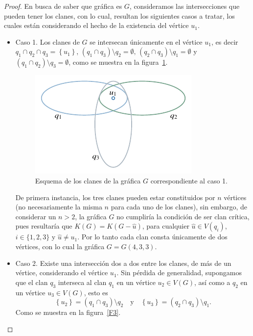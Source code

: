 \documentclass[12pt]{book}
\theoremstyle{definition}
\begin{document}
\begin{proof}
En busca de saber que gráfica es $G$, consideramos las intersecciones que pueden tener los clanes, con lo cual, resultan los siguientes casos a tratar, los cuales están considerando el hecho de la existencia del vértice $u_1$.
\begin{itemize}
\item Caso 1. 
Los clanes de $G$ se intersecan únicamente en el vértice $u_1$, es decir $q_1\cap q_2\cap q_3=\left\{u_1\right\}$, $(q_1\cap q_3)\setminus q_2=\emptyset  \text{, }(q_2\cap q_3)\setminus q_1=\emptyset$ y $(q_1\cap q_2)\setminus q_3=\emptyset$, como se muestra en la figura~\ref{F2}.

\begin{figure}[!htbp]
	\centering
	\includegraphics[scale=1.2]{Fig1.pdf}
	\caption{Esquema de los clanes de la gráfica $G$ correspondiente al caso 1.\label{F2}}
\end{figure}

De primera instancia, los tres clanes pueden estar constituidos por $n$ vértices (no necesariamente la misma $n$ para cada uno de los clanes), sin embargo, de considerar un $n>2$, la gráfica $G$ no cumpliría la condición de ser clan crítica, pues resultaría que $K(G)=K(G-\hat{u})$, para cualquier $\hat{u}\in V(q_i)$, $i\in\{1,2,3\}$ y $\hat{u}\neq u_1$. Por lo tanto cada clan consta únicamente de dos vértices, con lo cual la gráfica $G=G(4,3,3)$.

\item Caso 2.
Existe una intersección dos a dos entre los clanes, de más de un vértice, considerando el vértice $u_1$. Sin pérdida de generalidad, supongamos que el clan $q_3$ interseca al clan $q_1$ en un vértice $u_2\in V(G)$, así como a $q_2$ en un vértice $u_3\in V(G)$, esto es 
\begin{equation}\label{E1.1}
\left\{u_2\right\}=(q_1\cap q_3)\setminus q_2 \quad \text{y} \quad \left\{u_3\right\}=(q_2\cap q_3)\setminus q_1.
\end{equation}
Como se muestra en la figura~\ref{F3}.


\end{itemize}
\end{proof}
\end{document}
